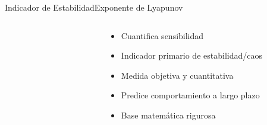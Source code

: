 \begin{frame}{Indicador de Estabilidad}{Exponente de Lyapunov}
\begin{columns}
\begin{column}{0.4\textwidth}
\begin{figure}[H]
            \end{figure}
        \end{column}
        \begin{column}{0.6\textwidth}
            \begin{itemize}
                \item Cuantifica sensibilidad
                \item Indicador primario de estabilidad/caos
                \item Medida objetiva y cuantitativa
                \item Predice comportamiento a largo plazo
                \item Base matemática rigurosa
            \end{itemize}
        \end{column}
    \end{columns}
\end{frame}

